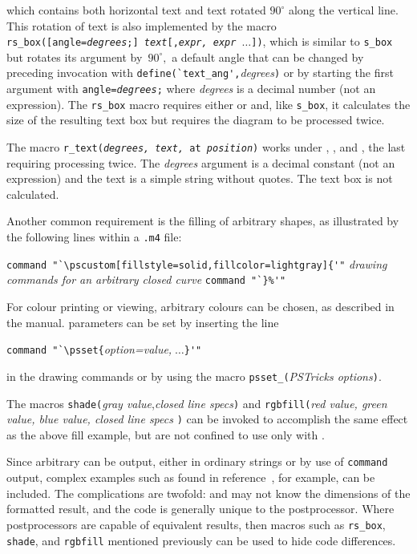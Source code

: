 {\small }

\noindent%
which contains both horizontal text and text rotated $90^\circ$ along the
vertical line.
This rotation of text is also implemented by the macro
{\tt rs\_box([angle={\sl degrees};] {\sl text}[,{\sl expr, expr $\ldots$}])},
which is similar
to {\tt s\_box} but rotates its argument by~$90^\circ,$ a default angle
that can be changed by preceding invocation with
\verb|define(`text_ang',|{\sl degrees}{\tt )}
or by starting the first argument with {\tt angle={\sl degrees};}
where {\sl degrees} is a decimal number (not an expression).
The {\tt rs\_box} macro
requires either \PSTricks or \TPGF and, like {\tt s\_box}, it calculates the
size of the resulting text box but requires the diagram to be
processed twice.

The macro {\tt r\_text({\sl degrees, text,} at {\sl position})}
works under \PSTricks, \TPGF, and \SVG, the last requiring
processing twice. The {\sl degrees} argument is a decimal constant
(not an expression) and the text is a simple string without quotes.
The text box is not calculated.

Another common requirement is the filling of arbitrary shapes, as
illustrated by the following lines within a {\tt .m4} file:

\vspace{\parsep}
\noindent%
\verb|command "`\pscustom[fillstyle=solid,fillcolor=lightgray]{'"|
\hfill\break
{\sl drawing commands for an arbitrary closed curve}
\hfill\break
\verb|command "`}%'"|
\vspace{\parsep}

For colour printing or viewing, arbitrary
colours can be chosen, as described in the \PSTricks manual.
\PSTricks parameters can be set by inserting the line

\vspace{\parsep}
\noindent\verb|command "`\psset{|{\sl option=value,}$\;\ldots$\verb|}'"|
\vspace{\parsep}

\noindent%
in the drawing commands or by using the macro
{\tt psset\_(}{\sl PSTricks options}{\tt )}.

The macros
 {\tt shade(}{\sl gray value},{\sl closed line specs}{\tt )}
and
 {\tt rgbfill(}{\sl red value, green value, blue value, closed line specs}%
 {\tt )}
can be invoked to accomplish the same effect as the above fill example, but
are not confined to use only with \PSTricks.

Since arbitrary \latex can be output, either in ordinary strings or by
use of {\tt command} output, complex examples such as found in
reference~\cite{Girou94},
for example, can be included.  The complications
are twofold: \latex and \dpic may not know the dimensions of the formatted
result, and the code is generally unique to the postprocessor.
Where postprocessors are capable of equivalent results, then
macros such as {\tt rs\_box}, {\tt shade}, and {\tt rgbfill} mentioned
previously can be used to hide code differences.

